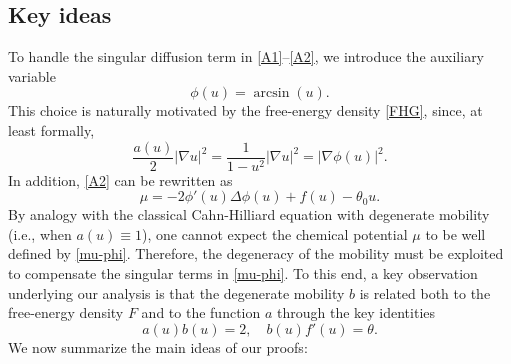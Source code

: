 \documentclass[11pt,  reqno]{amsart}%
\theoremstyle{plain}
\theoremstyle{definition}
\theoremstyle{remark}
\numberwithin{equation}{section}
\begin{document}
\subsection{Key ideas}  To handle the singular diffusion term in \eqref{A1}--\eqref{A2}, we introduce the auxiliary variable
$$
\phi(u)=\arcsin (u).
$$
This choice is naturally motivated by the free-energy density \eqref{FHG}, since, at least formally,
$$
\frac{a(u)}{2} |\nabla u|^2 = \frac{1}{1-u^2} |\nabla u|^2 =
|\nabla \phi(u)|^2.
$$
In addition, \eqref{A2} can be rewritten as
\begin{equation}
\label{mu-phi}
\mu= - 2 \phi'(u) \Delta \phi(u) + f(u) -\theta_0 u.
\end{equation}
By analogy with the classical Cahn-Hilliard equation with degenerate mobility (i.e., when $a(u)\equiv 1$), one cannot expect the chemical potential $\mu$ to be well defined by \eqref{mu-phi}. Therefore, the degeneracy of the  mobility must be exploited to compensate the singular terms in \eqref{mu-phi}.
To this end, a key observation underlying our analysis is that the degenerate mobility $b$ is related both to the free-energy density $F$ and to the function $a$ through the key identities
\begin{equation}
\label{key relation}
      a(u)b(u)=2, \quad b(u) f'(u)= \theta.
\end{equation} 
We now summarize the main ideas of our proofs:
\end{document}
